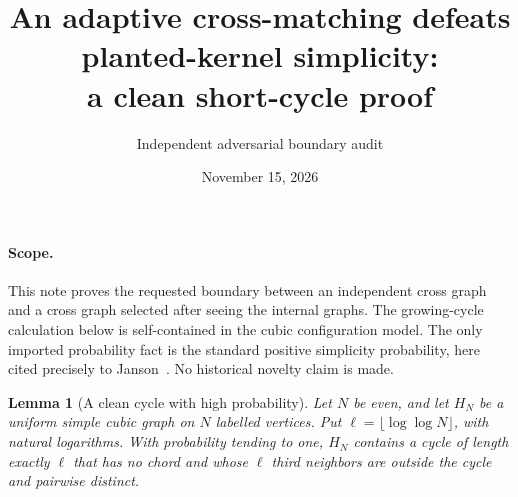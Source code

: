 \documentclass[11pt]{article}
\title{An adaptive cross-matching defeats planted-kernel simplicity:\\
a clean short-cycle proof}
\author{Independent adversarial boundary audit}
\date{November 15, 2026}
\newtheorem{lemma}[theorem]{Lemma}
\begin{document}
\maketitle

\paragraph{Scope.}
This note proves the requested boundary between an independent cross
graph and a cross graph selected after seeing the internal graphs.
The growing-cycle calculation below is self-contained in the cubic
configuration model. The only imported probability fact is the standard
positive simplicity probability, here cited precisely to
Janson~\cite[Corollary 1.5]{janson}.
No historical novelty claim is made.

\begin{lemma}[A clean cycle with high probability]\label{lem:cycle}
Let $N$ be even, and let $H_N$ be a uniform simple cubic graph on $N$
labelled vertices. Put $\ell=\lfloor\log\log N\rfloor$, with natural
logarithms. With probability tending to one, $H_N$ contains a cycle of
length exactly $\ell$ that has no chord and whose $\ell$ third neighbors
are outside the cycle and pairwise distinct.
\end{lemma}
\end{document}
